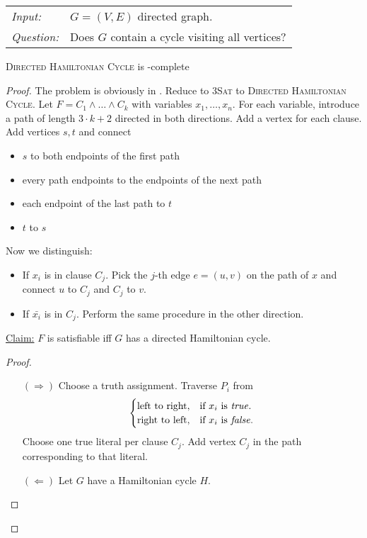 \documentclass[../skript.tex]{subfiles}
\begin{document}
\begin{problem}
\begin{tabular}{ll}
\textit{Input:} & $G = (V, E)$ directed graph. \\
\textit{Question:} & Does $G$ contain a cycle visiting all vertices?
\end{tabular}
\end{problem}
\begin{theorem} %
\label{thm:6}
\textsc{Directed Hamiltonian Cycle} is \NP-complete
\end{theorem}
\begin{proof}
The problem is obviously in \NP.
Reduce to \textsc{3Sat} to \textsc{Directed Hamiltonian Cycle}. Let $F = C_1 \wedge \ldots \wedge C_k$ with variables $x_1, \ldots, x_n$.
For each variable, introduce a path of length $3 \cdot k + 2$ directed in both directions.
Add a vertex for each clause. Add vertices $s, t$ and connect
\begin{itemize}
\item $s$ to both endpoints of the first path
\item every path endpoints to the endpoints of the next path
\item each endpoint of the last path to $t$
\item $t$ to $s$
\end{itemize}
Now we distinguish:
\begin{itemize}
\item If $x_i$ is in clause $C_j$. Pick the $j$-th edge $e = (u, v)$ on the path of $x$ and connect $u$ to $C_j$ and $C_j$ to $v$.
\item If $\bar{x_i}$ is in $C_j$. Perform the same procedure in the other direction.
\end{itemize}
\underline{Claim:} $F$ is satisfiable \ac{iff} $G$ has a directed Hamiltonian cycle.
\begin{proof}
\begin{itemize}
\item[$(\Rightarrow)$] Choose a truth assignment. Traverse $P_i$ from
\[
\begin{cases}
\text{left to right}, & \text{if } x_i \text{ is \textit{true}}. \\
\text{right to left}, & \text{if } x_i \text{ is \textit{false}}.
\end{cases}
\]
Choose one true literal per clause $C_j$. Add vertex $C_j$ in the path corresponding to that literal.
\item[$(\Leftarrow)$] Let $G$ have a Hamiltonian cycle $H$. \\

\end{itemize}
\end{proof}
\end{proof}
\end{document}
